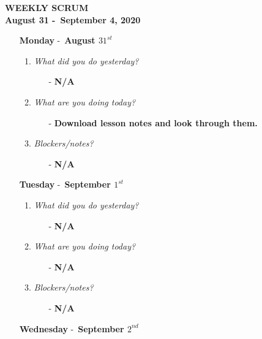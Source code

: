 \begin{center}
  \Huge\textbf{WEEKLY SCRUM}\\
  \large\textbf{August 31 -\ September 4, 2020}
\end{center}
\renewcommand{\labelenumii}{\Roman{enumii}.~}
\begin{enumerate}
  \item[\textbf{Monday}] -\ \textbf{August \(31^{st}\)}
   \begin{enumerate}
     \item \textsl{What did you do yesterday?}
     \begin{enumerate}
       \item[-] \textbf{N/A}
     \end{enumerate}
     \item \textsl{What are you doing today?}
      \begin{enumerate}
        \item[-] \textbf{Download lesson notes and look through them.}
      \end{enumerate}
     \item \textsl{Blockers/notes?}
     \begin{enumerate}
      \item[-] \textbf{N/A}
    \end{enumerate}
   \end{enumerate}
  \item[\textbf{Tuesday}] -\ \textbf{September \(1^{st}\)}
  \begin{enumerate}
    \item \textsl{What did you do yesterday?}
    \begin{enumerate}
      \item[-] \textbf{N/A}
    \end{enumerate}
    \item \textsl{What are you doing today?}
    \begin{enumerate}
      \item[-] \textbf{N/A}
    \end{enumerate}
    \item \textsl{Blockers/notes?}
    \begin{enumerate}
      \item[-] \textbf{N/A}
    \end{enumerate}
  \end{enumerate} 
  \item[\textbf{Wednesday}] -\ \textbf{September \(2^{nd}\)}
  \begin{enumerate}

\end{enumerate}
\end{enumerate}
